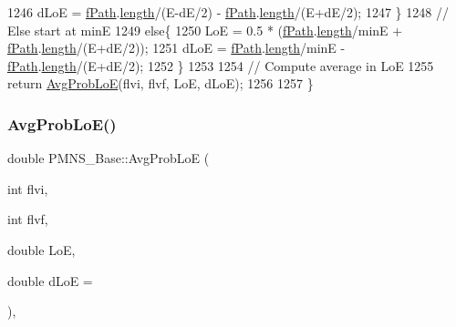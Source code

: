 \begin{DoxyCode}
1246     dLoE = \hyperlink{classOscProb_1_1PMNS__Base_a849437aa8891fe042e86886ce8f81c6e}{fPath}.\hyperlink{structOscProb_1_1NuPath_af22660894b6e25cf835500381b155557}{length}/(E-dE/2) - \hyperlink{classOscProb_1_1PMNS__Base_a849437aa8891fe042e86886ce8f81c6e}{fPath}.\hyperlink{structOscProb_1_1NuPath_af22660894b6e25cf835500381b155557}{length}/(E+dE/2);
1247   \}
1248   \textcolor{comment}{// Else start at minE}
1249   \textcolor{keywordflow}{else}\{
1250     LoE = 0.5 * (\hyperlink{classOscProb_1_1PMNS__Base_a849437aa8891fe042e86886ce8f81c6e}{fPath}.\hyperlink{structOscProb_1_1NuPath_af22660894b6e25cf835500381b155557}{length}/minE + \hyperlink{classOscProb_1_1PMNS__Base_a849437aa8891fe042e86886ce8f81c6e}{fPath}.\hyperlink{structOscProb_1_1NuPath_af22660894b6e25cf835500381b155557}{length}/(E+dE/2));
1251     dLoE = \hyperlink{classOscProb_1_1PMNS__Base_a849437aa8891fe042e86886ce8f81c6e}{fPath}.\hyperlink{structOscProb_1_1NuPath_af22660894b6e25cf835500381b155557}{length}/minE - \hyperlink{classOscProb_1_1PMNS__Base_a849437aa8891fe042e86886ce8f81c6e}{fPath}.\hyperlink{structOscProb_1_1NuPath_af22660894b6e25cf835500381b155557}{length}/(E+dE/2);
1252   \}
1253 
1254   \textcolor{comment}{// Compute average in LoE}
1255   \textcolor{keywordflow}{return} \hyperlink{classOscProb_1_1PMNS__Base_ac19a92f4ef428a7333ca8eed76fca637}{AvgProbLoE}(flvi, flvf, LoE, dLoE);
1256 
1257 \}
\end{DoxyCode}
\mbox{\label{classOscProb_1_1PMNS__Base_ac19a92f4ef428a7333ca8eed76fca637}} 
\subsubsection{\texorpdfstring{Avg\+Prob\+Lo\+E()}{AvgProbLoE()}}
{\footnotesize\ttfamily double P\+M\+N\+S\+\_\+\+Base\+::\+Avg\+Prob\+LoE (\begin{DoxyParamCaption}\item[{int}]{flvi,  }\item[{int}]{flvf,  }\item[{double}]{LoE,  }\item[{double}]{d\+LoE = {} }\end{DoxyParamCaption})\hspace{0.3cm}{\ttfamily [virtual]}, {\ttfamily [inherited]}}

